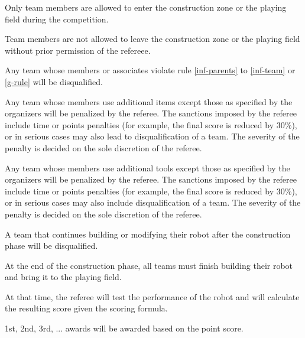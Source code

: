\documentclass[12pt]{hurocup}
\begin{document}
\begin{lawlist}[JC]

\item \label{inf-parents} Only team members are allowed to enter the
  construction zone or the playing field during the competition.

\item \label{inf-team} Team members are not allowed to leave the
  construction zone or the playing field without prior permission of
  the refereee.

\item Any team whose members or associates violate rule
  \ref{inf-parents} to \ref{inf-team} or \ref{g-rule} will be
  disqualified.

\item Any team whose members use additional items except those as
  specified by the organizers will be penalized by the referee. The
  sanctions imposed by the referee include time or points penalties
  (for example, the final score is reduced by 30\%), or in serious
  cases may also lead to disqualification of a team. The severity of
  the penalty is decided on the sole discretion of the referee.

\item Any team whose members use additional tools except those as
  specified by the organizers will be penalized by the referee. The
  sanctions imposed by the referee include time or points penalties
  (for example, the final score is reduced by 30\%), or in serious
  cases may also include disqualification of a team. The severity of
  the penalty is decided on the sole discretion of the referee.

\item A team that continues building or modifying their robot after
  the construction phase will be disqualified.

\end{lawlist}


\begin{lawlist}[JC]

\item At the end of the construction phase, all teams must finish
  building their robot and bring it to the playing field. 

\item At that time, the referee will test the performance of the robot
  and will calculate the resulting score given the scoring formula.

\item 1st, 2nd, 3rd, ... awards will be awarded based on the point
  score. 

\end{lawlist}
\end{document}
